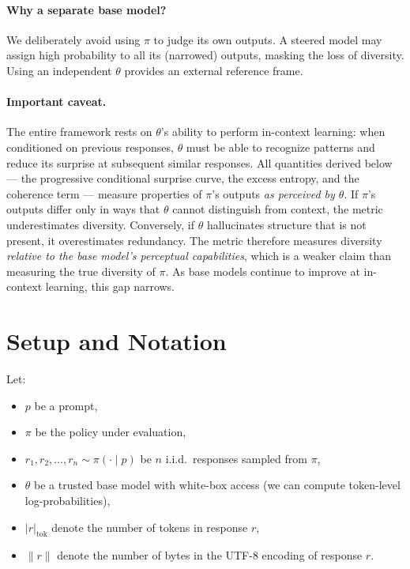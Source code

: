 \documentclass[11pt]{article}
\begin{document}
\paragraph{Why a separate base model?} We deliberately avoid using $\pi$ to judge its own outputs. A steered model may assign high probability to all its (narrowed) outputs, masking the loss of diversity. Using an independent $\theta$ provides an external reference frame.

\paragraph{Important caveat.} The entire framework rests on $\theta$'s ability to perform in-context learning: when conditioned on previous responses, $\theta$ must be able to recognize patterns and reduce its surprise at subsequent similar responses. All quantities derived below --- the progressive conditional surprise curve, the excess entropy, and the coherence term --- measure properties of $\pi$'s outputs \emph{as perceived by $\theta$}. If $\pi$'s outputs differ only in ways that $\theta$ cannot distinguish from context, the metric underestimates diversity. Conversely, if $\theta$ hallucinates structure that is not present, it overestimates redundancy. The metric therefore measures diversity \emph{relative to the base model's perceptual capabilities}, which is a weaker claim than measuring the true diversity of $\pi$. As base models continue to improve at in-context learning, this gap narrows.

\section{Setup and Notation}

Let:
\begin{itemize}[nosep]
    \item $p$ be a prompt,
    \item $\pi$ be the policy under evaluation,
    \item $r_1, r_2, \ldots, r_n \sim \pi(\cdot \mid p)$ be $n$ i.i.d.\ responses sampled from $\pi$,
    \item $\theta$ be a trusted base model with white-box access (we can compute token-level log-probabilities),
    \item $|r|_{\mathrm{tok}}$ denote the number of tokens in response $r$,
    \item $\|r\|$ denote the number of bytes in the UTF-8 encoding of response $r$.
\end{itemize}
\end{document}
